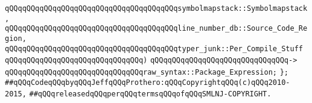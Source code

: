 \verb|qQQqqQQqqQQqqQQqqQQqqQQqqQQqqQQqqQQqqQQqsymbolmapstack::Symbolmapstack,|\newline
\verb|qQQqqQQqqQQqqQQqqQQqqQQqqQQqqQQqqQQqqQQqline_number_db::Source_Code_Region,|\newline
\verb|qQQqqQQqqQQqqQQqqQQqqQQqqQQqqQQqqQQqqQQqtyper_junk::Per_Compile_Stuff|\newline
\verb|qQQqqQQqqQQqqQQqqQQqqQQqqQQqqQQq)|\newline
\verb|qQQqqQQqqQQqqQQqqQQqqQQqqQQqqQQq->|\newline
\verb|qQQqqQQqqQQqqQQqqQQqqQQqqQQqqQQqraw_syntax::Package_Expression;|\newline
\verb|};|\newline
\newline
\newline
\verb|##qQQqCodeqQQqbyqQQqJeffqQQqProthero:qQQqCopyrightqQQq(c)qQQq2010-2015,|\newline
\verb|##qQQqreleasedqQQqperqQQqtermsqQQqofqQQqSMLNJ-COPYRIGHT.|\newline

